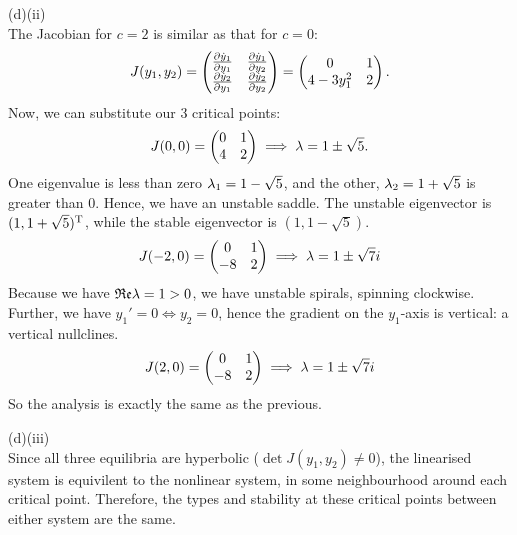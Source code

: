 \documentclass[a4paper,11pt]{report}
\begin{document}
\sol (d)(ii) \\
The Jacobian for $c=2$ is similar as that for $c=0$:
$$
  J(y_1,y_2) = \begin{pmatrix} \frac{\partial \dot{y}_1}{\partial y_1} & \frac{\partial \dot{y}_1}{\partial y_2} \\ \frac{\partial \dot{y}_2}{\partial y_1} & \frac{\partial \dot{y}_2}{\partial y_2} \end{pmatrix} = \begin{pmatrix} 0 & 1 \\ 4 - 3y_1^2 & 2 \end{pmatrix}.
$$
Now, we can substitute our 3 critical points:
$$
  J(0,0) = \begin{pmatrix} 0 & 1 \\ 4 & 2 \end{pmatrix} \implies \lambda = 1 \pm\sqrt{5}.
$$
One eigenvalue is less than zero $\lambda_1 = 1 - \sqrt{5}$, and the other, $\lambda_2 = 1 + \sqrt{5}$ is greater than 0. Hence, we have an unstable saddle. The unstable eigenvector is $(1, 1+\sqrt{5})^{\mathrm{T}}$, while the stable eigenvector is $(1, 1-\sqrt{5})$.
$$
  J(-2,0) = \begin{pmatrix} 0 & 1 \\ -8 & 2 \end{pmatrix} \implies \lambda = 1\pm\sqrt{7}i
$$
Because we have $\mathfrak{Re}\lambda=1>0$, we have unstable spirals, spinning clockwise. Further, we have $y_1'=0\iff y_2=0$, hence the gradient on the $y_1$-axis is vertical: a vertical nullclines.
$$
  J(2,0) = \begin{pmatrix} 0 & 1 \\ -8 & 2 \end{pmatrix} \implies \lambda = 1\pm\sqrt{7}i
$$
So the analysis is exactly the same as the previous.

\sol(d)(iii) \\
Since all three equilibria are hyperbolic ($\det J(y_1,y_2)\neq0$), the linearised system is equivilent to the nonlinear system, in some neighbourhood around each critical point. Therefore, the types and stability at these critical points between either system are the same.
\end{document}
